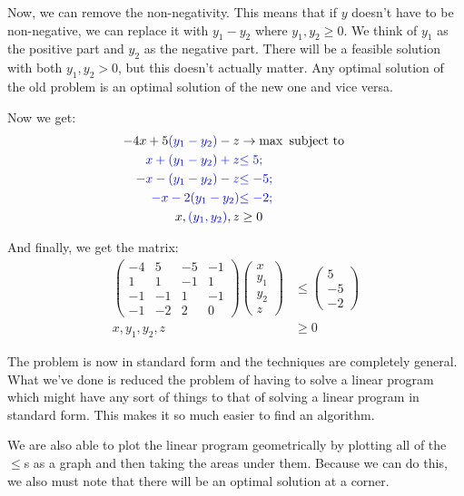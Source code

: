 \documentclass[11pt,a4paper,titlepage,dvipsnames,cmyk]{scrartcl}
\begin{document}
Now, we can remove the non-negativity. This means that if $y$ doesn't have
to be non-negative, we can replace it with $y_1 - y_2$ where $y_1, y_2 \ge
0$. We think of $y_1$ as the positive part and $y_2$ as the negative part.
There will be a feasible solution with both $y_1, y_2 > 0$, but this
doesn't actually matter. Any optimal solution of the old problem is an
optimal solution of the new one and vice versa.

Now we get:
\begin{align*}
    -4x+5{\color{blue}(y_1 - y_2)}-z &\rightarrow \max \text{ subject to } \\
    {\color{blue}x + {\color{blue}(y_1 - y_2)} + z} &{\color{blue}\le 5;} \\
    {\color{blue}- x - {\color{blue}(y_1 - y_2)} - z} &{\color{blue}\le -5;} \\
    {\color{blue} -x - 2{\color{blue}(y_1 - y_2)}} &{\color{blue}\le -2;} \\
    x,{\color{blue}(y_1, y_2)},z &\ge 0
\end{align*}

And finally, we get the matrix:
\begin{align*}
    \begin{pmatrix}
        -4 & 5 & -5 & -1 \\
        1 & 1 & -1 & 1 \\
        -1 & -1 & 1 & -1 \\
        -1 & -2 & 2 & 0
    \end{pmatrix}
    \begin{pmatrix}
        x \\
        y_1 \\
        y_2 \\
        z
    \end{pmatrix}
    &\le
    \begin{pmatrix}
        5 \\
        -5 \\
        -2
    \end{pmatrix} \\
    x,y_1,y_2,z &\ge 0
\end{align*}

The problem is now in standard form and the techniques are completely
general. What we've done is reduced the problem of having to solve a
linear program which might have any sort of things to that of solving a
linear program in standard form. This makes it so much easier to find an
algorithm.

We are also able to plot the linear program geometrically by plotting all
of the $\le$s as a graph and then taking the areas under them. Because we
can do this, we also must note that there will be an optimal solution at a
corner.
\end{document}
